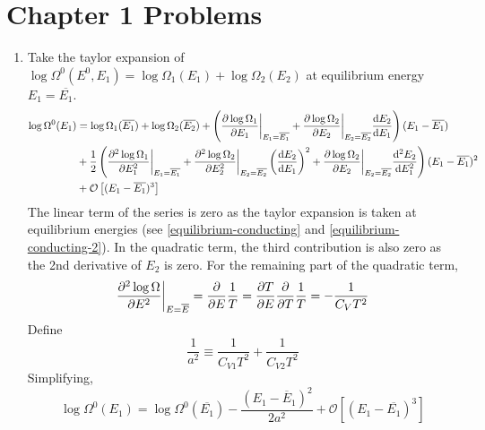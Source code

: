 \documentclass{article}
\begin{document}
\section{Chapter 1 Problems}
\begin{sol}[1]
    \begin{enumerate}[label=\textbf{(\alph*)}]
        \item Take the taylor expansion of $\log\Omega^0(E^0,E_1)=\log\Omega_1(E_1)+\log\Omega_2(E_2)$ at equilibrium energy $E_1=\overline{E_1}$.
        \begin{equation}
            \begin{aligned}
                \log\Omega^0(E_1)&=\log\Omega_1(\overline{E_1})+\log\Omega_2(\overline{E_2})+\left(\partialderivative{\log\Omega_1}{E_1}\bigg|_{E_1=\overline{E_1}}+\partialderivative{\log\Omega_2}{E_2}\bigg|_{E_2=\overline{E_2}}\derivative{E_2}{E_1}\right)(E_1-\overline{E_1})\\
                &+\frac{1}{2}\left(\partialderivative{^2\log\Omega_1}{E_1^2}\bigg|_{E_1=\overline{E_1}}+\partialderivative{^2\log\Omega_2}{E_2^2}\bigg|_{E_2=\overline{E_2}}\left(\derivative{E_2}{E_1}\right)^2+\partialderivative{\log\Omega_2}{E_2}\bigg|_{E_2=\overline{E_2}}\derivative{^2E_2}{E_1^2}\right)(E_1-\overline{E_1})^2\\
                &+\mathcal{O}\left[(E_1-\overline{E_1})^3\right]
            \end{aligned}
        \end{equation}
        The linear term of the series is zero as the taylor expansion is taken at equilibrium energies (see \eqref{equilibrium-conducting} and \eqref{equilibrium-conducting-2}). In the quadratic term, the third contribution is also zero as the 2nd derivative of $E_2$ is zero. For the remaining part of the quadratic term,
        \begin{equation}
            \partialderivative{^2\log\Omega}{E^2}\bigg|_{E=\overline{E}}=\partialderivative{}{E}\frac{1}{T}=\partialderivative{T}{E}\partialderivative{}{T}\frac{1}{T}=-\frac{1}{C_VT^2}
        \end{equation}
        Define
        \begin{equation}
            \frac{1}{a^2}\equiv\frac{1}{C_{V1}T^2}+\frac{1}{C_{V2}T^2}\label{rms:1-1}
        \end{equation}
        Simplifying,
        \begin{equation}
            \log\Omega^0(E_1)=\log\Omega^0(\overline{E_1})-\frac{(E_1-\overline E_1)^2}{2a^2}+\mathcal{O}\left[(E_1-\overline{E_1})^3\right]\label{gaussian:1-1}

\end{equation}
\end{enumerate}
\end{sol}
\end{document}
